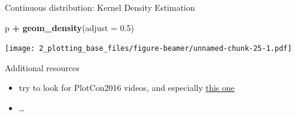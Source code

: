 \documentclass[
  ignorenonframetext,
]{beamer}
\newenvironment{Shaded}{\begin{snugshade}}{\end{snugshade}}
\newcommand{\DataTypeTok}[1]{\textcolor[rgb]{0.13,0.29,0.53}{#1}}
\newcommand{\FloatTok}[1]{\textcolor[rgb]{0.00,0.00,0.81}{#1}}
\newcommand{\KeywordTok}[1]{\textcolor[rgb]{0.13,0.29,0.53}{\textbf{#1}}}
\newcommand{\NormalTok}[1]{#1}
\newcommand{\OperatorTok}[1]{\textcolor[rgb]{0.81,0.36,0.00}{\textbf{#1}}}
\newcommand{\StringTok}[1]{\textcolor[rgb]{0.31,0.60,0.02}{#1}}
\providecommand{\tightlist}{%
  \setlength{\itemsep}{0pt}\setlength{\parskip}{0pt}}
\begin{document}
\begin{frame}[fragile]{Continuous distribution: Kernel Density
Estimation}
\protect\hypertarget{continuous-distribution-kernel-density-estimation-2}{}

\begin{Shaded}
\begin{Highlighting}[]
\NormalTok{p }\OperatorTok{+}\StringTok{ }\KeywordTok{geom_density}\NormalTok{(}\DataTypeTok{adjust =} \FloatTok{0.5}\NormalTok{)}
\end{Highlighting}
\end{Shaded}

\texttt{[image: 2\_plotting\_base\_files/figure-beamer/unnamed-chunk-25-1.pdf]}

\end{frame}

\begin{frame}{Additional resources}
\protect\hypertarget{additional-resources}{}

\begin{itemize}
\tightlist
\item
  try to look for PlotCon2016 videos, and especially
  \href{https://www.youtube.com/watch?v=RG_BKQRbJZw}{this one}
\item
  \ldots{}
\end{itemize}

\end{frame}
\end{document}
